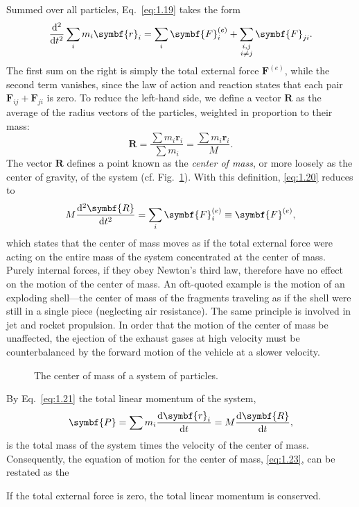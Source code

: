 Summed over all particles, Eq.~\eqref{eq:1.19} takes the form
\begin{equation}
    \odv*[2]{\sum_im_i\symbf{r}_i}{t}=\sum_i\symbf{F}_i^{\left(e\right)}+\sum_{\substack{i,j\\i\ne j}}\symbf{F}_{ji}.\label{eq:1.20}
\end{equation}
The first sum on the right is simply the total external force \(\symbf{F}^{\left(e\right)}\), while the second term vanishes, since the law of action and reaction states that each pair \(\symbf{F}_{ij}+\symbf{F}_{ji}\) is zero. To reduce the left-hand side, we define a vector \(\symbf{R}\) as the average of the radius vectors of the particles, weighted in proportion to their mass:
\begin{equation}
    \symbf{R}=\frac{\sum m_i\symbf{r}_i}{\sum m_i}=\frac{\sum m_i\symbf{r}_i}{M}.\label{eq:1.21}
\end{equation}
The vector \(\symbf{R}\) defines a point known as the \emph{center of mass}, or more loosely as the center of gravity, of the system (cf. Fig.~\ref{fig:1.1}). With this definition, \eqref{eq:1.20} reduces to
\begin{equation}
    M\odv[2]{\symbf{R}}{t}=\sum_i\symbf{F}_i^{\left(e\right)}\equiv\symbf{F}^{\left(e\right)},
\end{equation}
which states that the center of mass moves as if the total external force were acting on the entire mass of the system concentrated at the center of mass. Purely internal forces, if they obey Newton's third law, therefore have no effect on the motion of the center of mass. An oft-quoted example is the motion of an exploding shell---the center of mass of the fragments traveling as if the shell were still in a single piece (neglecting air resistance). The same principle is involved in jet and rocket propulsion. In order that the motion of the center of mass be unaffected, the ejection of the exhaust gases at high velocity must be counterbalanced by the forward motion of the vehicle at a slower velocity.

\begin{figure}[htbp]
    \centering
    \caption{The center of mass of a system of particles.}
    \label{fig:1.1}
\end{figure}

By Eq.~\eqref{eq:1.21} the total linear momentum of the system,
\begin{equation}
    \symbf{P}=\sum m_i\odv{\symbf{r}_i}{t}=M\odv{\symbf{R}}{t},\label{eq:1.23}
\end{equation}
is the total mass of the system times the velocity of the center of mass. Consequently, the equation of motion for the center of mass, \eqref{eq:1.23}, can be restated as the
\begin{theorem}
    If the total external force is zero, the total linear momentum is conserved.
\end{theorem}

